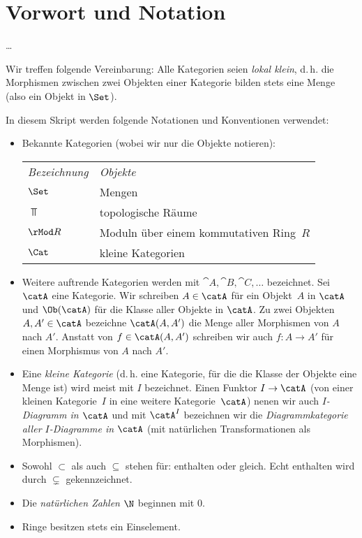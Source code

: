 
\chapter{Vorwort und Notation}
\ldots

\bigskip
Wir treffen folgende Vereinbarung:
Alle Kategorien seien \emph{lokal klein}, d.\,h. die Morphismen zwischen
zwei Objekten einer Kategorie bilden stets eine Menge (also ein Objekt
in $\Set$).

\bigskip
In diesem Skript werden folgende Notationen und Konventionen verwendet:
\begin{itemize}
    \item
        Bekannte Kategorien (wobei wir nur die Objekte notieren):
        
        \hspace{6mm}
        \begin{tabular}{l@{\qquad}l}
            \emph{Bezeichnung} & \emph{Objekte}                         \\[2pt]
            $\Set$      &   Mengen                                      \\
            $\Top$      &   topologische Räume                          \\
            $\rMod R$   &   Moduln über einem kommutativen Ring~$R$     \\
            $\Cat$      &   kleine Kategorien
        \end{tabular}

    \item
        Weitere auftrende Kategorien werden mit $\cat A,\cat B, \cat C, \dots$
        bezeichnet. Sei $\catA$ eine Kategorie. Wir schreiben $A\in\catA$
        für ein Objekt~$A$ in $\catA$ und $\Ob(\catA)$ für die Klasse aller
        Objekte in $\catA$. Zu zwei Objekten $A,A'\in\catA$ bezeichne
        $\catA(A,A')$ die Menge aller Morphismen von $A$ nach $A'$.
        Anstatt von $f\in\catA(A,A')$ schreiben wir auch $f\colon A\to A'$ für
        einen Morphismus von $A$ nach $A'$.

    \item
        Eine \emph{kleine Kategorie} (d.\,h. eine Kategorie, für die die Klasse
        der Objekte eine Menge ist) wird meist mit $I$ bezeichnet. Einen Funktor
        $I\to\catA$ (von einer kleinen Kategorie~$I$ in eine weitere
        Kategorie~$\catA$) nenen wir auch \emph{$I$-Diagramm in $\catA$} und
        mit $\catA^I$ bezeichnen wir die \emph{Diagrammkategorie aller
        $I$-Diagramme in $\catA$} (mit natürlichen Transformationen als
        Morphismen).

    \item
        Sowohl $\subset$ als auch $\subseteq$ stehen für: enthalten oder gleich.
        Echt enthalten wird durch $\subsetneq$ gekennzeichnet.
    
    \item
        Die \emph{natürlichen Zahlen $\N$} beginnen mit $0$.

    \item
        Ringe besitzen stets ein Einselement.
\end{itemize}
